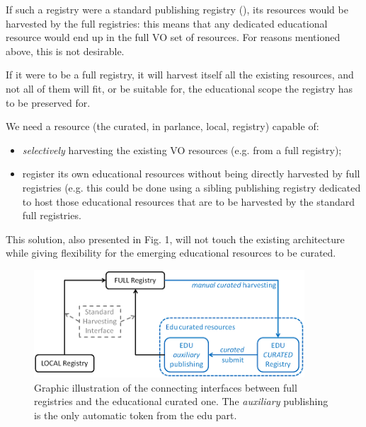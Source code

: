 \documentclass{ivoa}
\begin{document}
If such a registry were a standard publishing registry
(\citep{2009ivoa.spec.1104B}),
its resources would be harvested by the full registries: this means 
that any dedicated educational resource would end up in the full VO 
set of resources.  For reasons mentioned above, this is not
desirable.


If it were to be a full registry, it will harvest itself all the existing
resources, and not all of them will fit, or be suitable for, the educational
scope the registry has to be preserved for.
  


We need a resource (the curated, in \citep{2009ivoa.spec.1104B}
parlance, local, registry) capable of:
  
\begin{itemize}

\item 
\emph{selectively}
 harvesting the existing VO resources 
	(e.g. from a full registry);{}

\item register its own educational resources without being directly
	harvested by full registries (e.g. this could be done using a
	sibling publishing registry dedicated to host those educational
	resources that are to be harvested by the standard full registries.{}

\end{itemize}

This solution, also presented in Fig. 1, will not touch the existing architecture
while giving flexibility for the emerging educational resources to 
be curated.
  


\begin{figure}

\includegraphics[width=0.9\textwidth]{curation.png}
\caption{Graphic illustration
    of the connecting interfaces between full registries and the educational
    curated one. The 
\emph{auxiliary}
 publishing is the only automatic token
    from the edu part.}
\label{fig:curation}
\end{figure}
\end{document}
